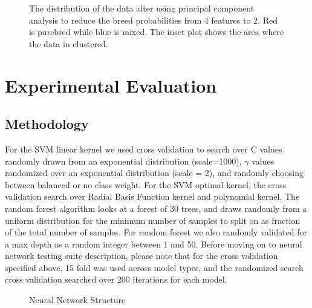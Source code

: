 \documentclass[12pt]{article}
\begin{document}
\begin{figure}[H]
\caption{The distribution of the data after using principal component analysis to reduce the breed probabilities from 4 features to 2. Red is purebred while blue is mixed. The inset plot shows the area where the data in clustered.}
\end{figure}

\section{Experimental Evaluation}

\subsection{Methodology}

For the SVM linear kernel we used cross validation to search over C values randomly drawn from an exponential distribution (scale=1000), $\gamma$ values randomized over an exponential distribution (scale = 2), and randomly choosing between balanced or no class weight. For the SVM optimal kernel, the cross validation search over Radial Basis Function kernel and polynomial kernel. The random forest algorithm looks at a forest of 30 trees, and draws randomly from a uniform distribution for the minimum number of samples to split on as fraction of the total number of samples. For random forest we also randomly validated for a max depth as a random integer between 1 and 50. Before moving on to neural network testing suite description, please note that for the cross validation specified above, 15 fold was used across model types, and the randomized search cross validation searched over 200 iterations for each model.

\begin{figure}[H]
\caption{Neural Network Structure}
\end{figure}
\end{document}

